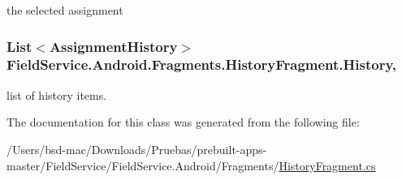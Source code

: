 the selected assignment 

\hypertarget{class_field_service_1_1_android_1_1_fragments_1_1_history_fragment_af376472c171eab56ce98e2eec5b68bb5}{
\subsubsection[{History}]{\setlength{\rightskip}{0pt plus 5cm}List$<${\bf Assignment\+History}$>$ Field\+Service.\+Android.\+Fragments.\+History\+Fragment.\+History\hspace{0.3cm}{\ttfamily [get]}, {\ttfamily [set]}}}\label{class_field_service_1_1_android_1_1_fragments_1_1_history_fragment_af376472c171eab56ce98e2eec5b68bb5}


list of history items. 



The documentation for this class was generated from the following file\+:\begin{DoxyCompactItemize}
\item 
/\+Users/bsd-\/mac/\+Downloads/\+Pruebas/prebuilt-\/apps-\/master/\+Field\+Service/\+Field\+Service.\+Android/\+Fragments/\hyperlink{_history_fragment_8cs}{History\+Fragment.\+cs}\end{DoxyCompactItemize}

